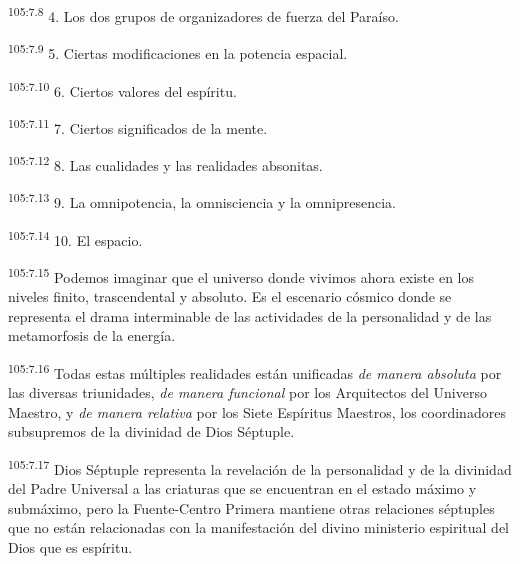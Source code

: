 \documentclass[twoside, 11pt]{book}
\begin{document}
\par
\textsuperscript{105:7.8} 4. Los dos grupos de organizadores de fuerza del Paraíso.

\par
\textsuperscript{105:7.9} 5. Ciertas modificaciones en la potencia espacial.

\par
\textsuperscript{105:7.10} 6. Ciertos valores del espíritu.

\par
\textsuperscript{105:7.11} 7. Ciertos significados de la mente.

\par
\textsuperscript{105:7.12} 8. Las cualidades y las realidades absonitas.

\par
\textsuperscript{105:7.13} 9. La omnipotencia, la omnisciencia y la omnipresencia.

\par
\textsuperscript{105:7.14} 10. El espacio.

\par
\textsuperscript{105:7.15} Podemos imaginar que el universo donde vivimos ahora existe en los niveles finito, trascendental y absoluto. Es el escenario cósmico donde se representa el drama interminable de las actividades de la personalidad y de las metamorfosis de la energía.

\par
\textsuperscript{105:7.16} Todas estas múltiples realidades están unificadas \textit{de manera absoluta} por las diversas triunidades, \textit{de manera funcional} por los Arquitectos del Universo Maestro, y \textit{de manera relativa} por los Siete Espíritus Maestros, los coordinadores subsupremos de la divinidad de Dios Séptuple.

\par
\textsuperscript{105:7.17} Dios Séptuple representa la revelación de la personalidad y de la divinidad del Padre Universal a las criaturas que se encuentran en el estado máximo y submáximo, pero la Fuente-Centro Primera mantiene otras relaciones séptuples que no están relacionadas con la manifestación del divino ministerio espiritual del Dios que es espíritu.
\end{document}
